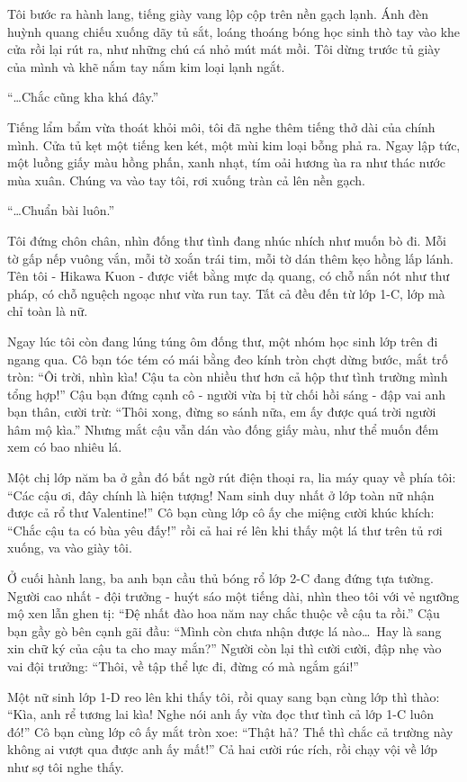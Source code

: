 \documentclass[../main.tex]{subfiles}
\begin{document}
Tôi bước ra hành lang, tiếng giày vang lộp cộp trên nền gạch lạnh. Ánh đèn huỳnh quang chiếu xuống dãy tủ sắt, loáng thoáng bóng học sinh thò tay vào khe cửa rồi lại rút ra, như những chú cá nhỏ mút mát mồi. Tôi dừng trước tủ giày của mình và khẽ nắm tay nắm kim loại lạnh ngắt.

``\dots Chắc cũng kha khá đây.''

Tiếng lẩm bẩm vừa thoát khỏi môi, tôi đã nghe thêm tiếng thở dài của chính mình.  Cửa tủ kẹt một tiếng ken két, một mùi kim loại bỗng phả ra. Ngay lập tức, một luồng giấy màu hồng phấn, xanh nhạt, tím oải hương ùa ra như thác nước mùa xuân.  Chúng va vào tay tôi, rơi xuống tràn cả lên nền gạch.

``\dots Chuẩn bài luôn.''

Tôi đứng chôn chân, nhìn đống thư tình đang nhúc nhích như muốn bò đi. Mỗi tờ gấp nếp vuông vắn, mỗi tờ xoắn trái tim, mỗi tờ dán thêm kẹo hồng lấp lánh. Tên tôi - Hikawa Kuon - được viết bằng mực dạ quang, có chỗ nắn nót như thư pháp, có chỗ nguệch ngoạc như vừa run tay. Tất cả đều đến từ lớp 1-C, lớp mà chỉ toàn là nữ.

Ngay lúc tôi còn đang lúng túng ôm đống thư, một nhóm học sinh lớp trên đi ngang qua. Cô bạn tóc tém có mái bằng đeo kính tròn chợt dừng bước, mắt trố tròn: ``Ôi trời, nhìn kìa! Cậu ta còn nhiều thư hơn cả hộp thư tình trường mình tổng hợp!'' Cậu bạn đứng cạnh cô - người vừa bị từ chối hồi sáng - đập vai anh bạn thân, cười trừ: ``Thôi xong, đừng so sánh nữa, em ấy được quá trời người hâm mộ kìa.'' Nhưng mắt cậu vẫn dán vào đống giấy màu, như thể muốn đếm xem có bao nhiêu lá.

Một chị lớp năm ba ở gần đó bất ngờ rút điện thoại ra, lia máy quay về phía tôi: ``Các cậu ơi, đây chính là hiện tượng! Nam sinh duy nhất ở lớp toàn nữ nhận được cả rổ thư Valentine!'' Cô bạn cùng lớp cô ấy che miệng cười khúc khích: ``Chắc cậu ta có bùa yêu đấy!'' rồi cả hai ré lên khi thấy một lá thư trên tủ rơi xuống, va vào giày tôi.

Ở cuối hành lang, ba anh bạn cầu thủ bóng rổ lớp 2-C đang đứng tựa tường. Người cao nhất - đội trưởng - huýt sáo một tiếng dài, nhìn theo tôi với vẻ ngưỡng mộ xen lẫn ghen tị: ``Đệ nhất đào hoa năm nay chắc thuộc về cậu ta rồi.'' Cậu bạn gầy gò bên cạnh gãi đầu: ``Mình còn chưa nhận được lá nào\dots\ Hay là sang xin chữ ký của cậu ta cho may mắn?'' Người còn lại thì cười cười, đập nhẹ vào vai đội trưởng: ``Thôi, về tập thể lực đi, đừng có mà ngắm gái!''

Một nữ sinh lớp 1-D reo lên khi thấy tôi, rồi quay sang bạn cùng lớp thì thào: ``Kìa, anh rể tương lai kìa! Nghe nói anh ấy vừa đọc thư tình cả lớp 1-C luôn đó!'' Cô bạn cùng lớp cô ấy mắt tròn xoe: ``Thật hả? Thế thì chắc cả trường này không ai vượt qua được anh ấy mất!'' Cả hai cười rúc rích, rồi chạy vội về lớp như sợ tôi nghe thấy.
\end{document}
